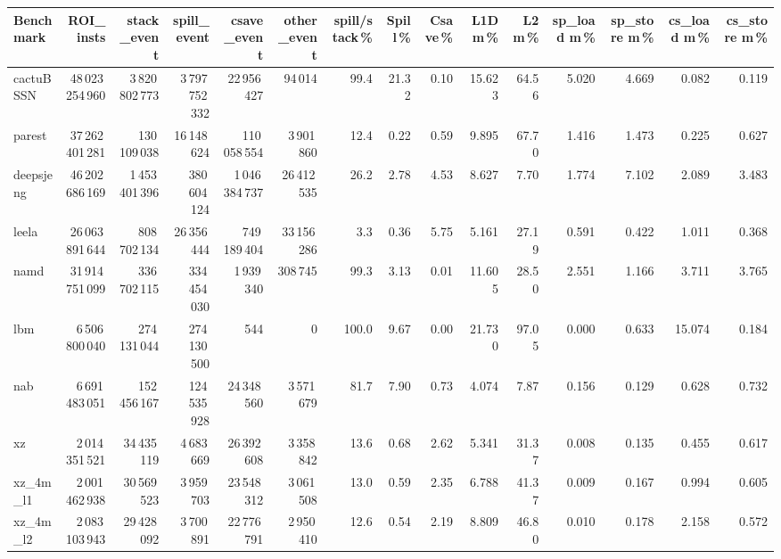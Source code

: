 \documentclass[9pt,landscape,a4paper]{article}
\begin{document}
\vspace{2mm}
\centering
\begin{adjustbox}{max width=\textwidth, max totalheight=0.50\textheight}%
\begin{tabular}{lrrrrrrrrrrrrrr}
\toprule
Benchmark & ROI\_insts & stack\_event & \textbf{spill\_event} & csave\_event & other\_event & spill/stack\,\% & Spill\,\% & Csave\,\% & L1D m\,\% & L2 m\,\% & sp\_load m\,\% & sp\_store m\,\% & cs\_load m\,\% & cs\_store m\,\% \\
\midrule
cactuBSSN & 48\,023\,254\,960 & 3\,820\,802\,773 & 3\,797\,752\,332 & 22\,956\,427 & 94\,014 & 99.4 & 21.32 & 0.10 & 15.623 & 64.56 & 5.020 & 4.669 & 0.082 & 0.119 \\
parest & 37\,262\,401\,281 & 130\,109\,038 & 16\,148\,624 & 110\,058\,554 & 3\,901\,860 & 12.4 & 0.22 & 0.59 & 9.895 & 67.70 & 1.416 & 1.473 & 0.225 & 0.627 \\
deepsjeng & 46\,202\,686\,169 & 1\,453\,401\,396 & 380\,604\,124 & 1\,046\,384\,737 & 26\,412\,535 & 26.2 & 2.78 & 4.53 & 8.627 & 7.70 & 1.774 & 7.102 & 2.089 & 3.483 \\
leela & 26\,063\,891\,644 & 808\,702\,134 & 26\,356\,444 & 749\,189\,404 & 33\,156\,286 & 3.3 & 0.36 & 5.75 & 5.161 & 27.19 & 0.591 & 0.422 & 1.011 & 0.368 \\
namd & 31\,914\,751\,099 & 336\,702\,115 & 334\,454\,030 & 1\,939\,340 & 308\,745 & 99.3 & 3.13 & 0.01 & 11.605 & 28.50 & 2.551 & 1.166 & 3.711 & 3.765 \\
lbm & 6\,506\,800\,040 & 274\,131\,044 & 274\,130\,500 & 544 & 0 & 100.0 & 9.67 & 0.00 & 21.730 & 97.05 & 0.000 & 0.633 & 15.074 & 0.184 \\
nab & 6\,691\,483\,051 & 152\,456\,167 & 124\,535\,928 & 24\,348\,560 & 3\,571\,679 & 81.7 & 7.90 & 0.73 & 4.074 & 7.87 & 0.156 & 0.129 & 0.628 & 0.732 \\
xz & 2\,014\,351\,521 & 34\,435\,119 & 4\,683\,669 & 26\,392\,608 & 3\,358\,842 & 13.6 & 0.68 & 2.62 & 5.341 & 31.37 & 0.008 & 0.135 & 0.455 & 0.617 \\
xz\_4m\_l1 & 2\,001\,462\,938 & 30\,569\,523 & 3\,959\,703 & 23\,548\,312 & 3\,061\,508 & 13.0 & 0.59 & 2.35 & 6.788 & 41.37 & 0.009 & 0.167 & 0.994 & 0.605 \\
xz\_4m\_l2 & 2\,083\,103\,943 & 29\,428\,092 & 3\,700\,891 & 22\,776\,791 & 2\,950\,410 & 12.6 & 0.54 & 2.19 & 8.809 & 46.80 & 0.010 & 0.178 & 2.158 & 0.572 \\

\end{tabular}
\end{adjustbox}
\end{document}
